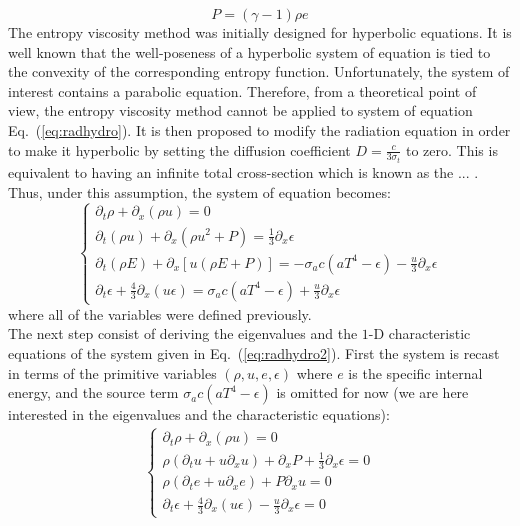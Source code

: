 \documentclass{article}
\newcommand{\eqt}[1]{Eq.~(\ref{#1})}                     %
\begin{document}
\begin{equation}
\label{eq:eos}
P = (\gamma-1) \rho e
\end{equation} 
The entropy viscosity method was initially designed for hyperbolic equations. It is well known that the well-poseness of a hyperbolic system of equation is tied to the convexity of the corresponding entropy function. Unfortunately, the system of interest contains a parabolic equation. Therefore, from a theoretical point of view, the entropy viscosity method cannot be applied to system of equation \eqt{eq:radhydro}. It is then proposed to modify the radiation equation in  order to make it hyperbolic by setting the diffusion coefficient $D=\frac{c}{3\sigma_t}$ to zero. This is equivalent to having an infinite total cross-section which is known as the ... . Thus, under this assumption, the system of equation becomes:
\begin{equation}
\label{eq:radhydro2}
\left\{
\begin{array}{llll}
\partial_t \rho + \partial_x \left( \rho u \right) = 0\\
\partial_t \left( \rho u \right) + \partial_x \left( \rho u^2 + P \right) = \frac{1}{3} \partial_x \epsilon \\
\partial_t \left( \rho E \right) + \partial_x \left[ u \left(\rho E + P \right) \right] = - \sigma_a c \left( a T^4 - \epsilon \right) - \frac{u}{3} \partial_x \epsilon \\
\partial_t \epsilon + \frac{4}{3} \partial_x \left( u \epsilon  \right) =  \sigma_a c \left( a T^4 - \epsilon \right) + \frac{u}{3} \partial_x \epsilon 
\end{array}
\right.
\end{equation}
where all of the variables were defined previously. \\
The next step consist of deriving the eigenvalues and the $1$-D characteristic equations of the system given in \eqt{eq:radhydro2}. First the system is recast in terms of the primitive variables $(\rho, u, e, \epsilon)$ where $e$ is the specific internal energy, and the source term $\sigma_a c (aT^4 - \epsilon)$ is omitted for now (we are here interested in the eigenvalues and the characteristic equations):
\begin{eqnarray}
\label{eq:radhydro3}
\left\{
\begin{array}{llll}
\partial_t \rho + \partial_x \left( \rho u \right) = 0 \\
\rho \left( \partial_t u + u \partial_x u \right) + \partial_x P +\frac{1}{3} \partial_x \epsilon = 0 \\
\rho \left( \partial_t e + u \partial_x e \right) + P \partial_x u =  0 \\
\partial_t \epsilon + \frac{4}{3} \partial_x \left( u \epsilon \right) - \frac{u}{3} \partial_x \epsilon = 0
\end{array}
\right.
\end{eqnarray}
\end{document}
